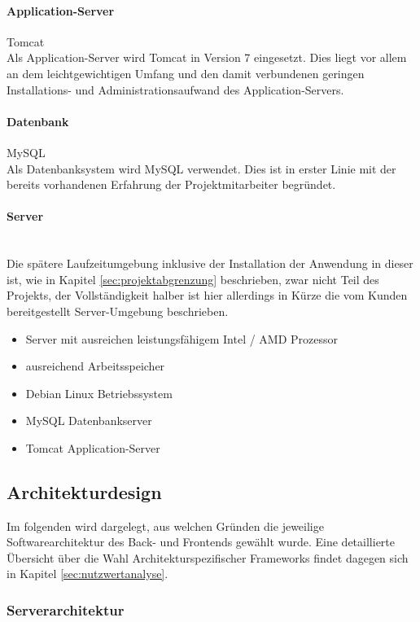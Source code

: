 \documentclass[12pt, xcolor=dvipsnames]{scrartcl}
\begin{document}
\paragraph{Application-Server} Tomcat \\
Als Application-Server wird Tomcat in Version 7 eingesetzt. Dies liegt vor allem an dem leichtgewichtigen Umfang und den damit verbundenen geringen Installations- und Administrationsaufwand des Application-Servers. 

\paragraph{Datenbank} MySQL \\
Als Datenbanksystem wird MySQL verwendet. Dies ist in erster Linie mit der bereits vorhandenen Erfahrung der Projektmitarbeiter begründet.

\paragraph{Server} ~\\
\label{par:zielplattform_server}%
Die spätere Laufzeitumgebung inklusive der Installation der Anwendung in dieser ist, wie in Kapitel \ref{sec:projektabgrenzung} beschrieben, zwar nicht Teil des Projekts, der Vollständigkeit halber ist hier allerdings in Kürze die vom Kunden bereitgestellt Server-Umgebung beschrieben.
\begin{itemize}
	\item Server mit ausreichen leistungsfähigem Intel / AMD Prozessor
	\item ausreichend Arbeitsspeicher
	\item Debian Linux Betriebssystem
	\item MySQL Datenbankserver
	\item Tomcat Application-Server	
\end{itemize}


\subsection{Architekturdesign}

Im folgenden wird dargelegt, aus welchen Gründen die jeweilige Softwarearchitektur des Back- und Frontends gewählt wurde. Eine detaillierte Übersicht über die Wahl Architekturspezifischer Frameworks findet dagegen sich in Kapitel \ref{sec:nutzwertanalyse}. \\

\subsubsection{Serverarchitektur}
\end{document}
